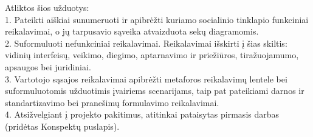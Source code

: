 \documentclass{VUMIFPSkursinis}
\begin{document}
Atliktos šios užduotys:
\\1. Pateikti aiškiai sunumeruoti ir apibrėžti kuriamo socialinio tinklapio funkciniai reikalavimai, o jų tarpusavio sąveika atvaizduota sekų diagramomis. 
\\2. Suformuluoti nefunkciniai reikalavimai. Reikalavimai išskirti į šias skiltis: vidinių interfeisų, veikimo, diegimo, aptarnavimo ir priežiūros, tiražuojamumo, apsaugos bei juridiniai.
\\3. Vartotojo sąsajos reikalavimai apibrėžti metaforos reikalavimų lentele bei suformuluotomis užduotimis įvairiems scenarijams, taip pat pateikiami darnos ir standartizavimo bei pranešimų formulavimo reikalavimai.
\\4. Atsižvelgiant į projekto pakitimus, atitinkai pataisytas pirmasis darbas (pridėtas Konspektų puslapis).

\newpage
\end{document}
